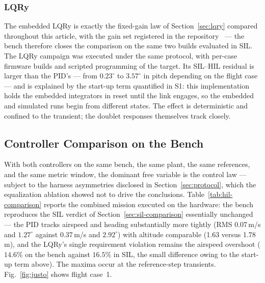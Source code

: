 \subsubsection{LQRy} The embedded LQRy is exactly the fixed-gain law
of Section~\ref{sec:lqry} compared throughout this article, with the
gain set registered in the repository~\cite{repo} --- the bench
therefore closes the comparison on the same two builds evaluated in
SIL. The LQRy campaign was executed under the same
protocol, with per-case firmware builds and scripted programming of the
target. Its SIL--HIL residual is larger than the PID's --- from $0.23^\circ$ to
$3.57^\circ$ in pitch depending on the flight case --- and is explained by
the start-up term quantified in S1: this implementation holds the
embedded integrators in reset until the link engages, so the embedded and
simulated runs begin from different states. The effect is deterministic
and confined to the transient; the doublet responses themselves track
closely.

\subsection{Controller Comparison on the Bench}
\label{sec:fair}
With both controllers on the same bench, the same plant, the same
references, and the same metric window, the dominant free variable is
the control law --- subject to the harness asymmetries disclosed in
Section~\ref{sec:protocol}, which the equalization ablation showed not
to drive the conclusions. Table~\ref{tab:hil-comparison} reports the
combined mission executed on the hardware: the bench reproduces the
SIL verdict of Section~\ref{sec:sil-comparison} essentially unchanged
--- the PID tracks airspeed and heading substantially more tightly
(RMS 0.07\,m/s and $1.27^\circ$ against 0.37\,m/s and $2.92^\circ$)
with altitude comparable (1.63 versus 1.78\,m), and the LQRy's single
requirement violation remains the airspeed overshoot ($14.6\%$ on the
bench against $16.5\%$ in SIL, the small difference owing to the
start-up term above). The maxima occur at the reference-step
transients. Fig.~\ref{fig:justo} shows flight case~1.

